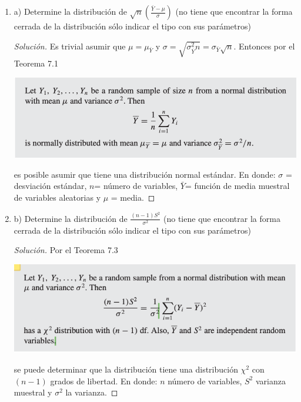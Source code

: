 \documentclass[a4paper,12pt]{article}
\newenvironment{solution}
  {\renewcommand\qedsymbol{$\blacksquare$}\begin{proof}[Solución]}
  {\end{proof}}
\begin{document}
\begin{enumerate}
\item a) Determine la distribución de $\sqrt{n}\left(\frac{\bar{Y}-\mu}{\sigma}\right)$ (no tiene que encontrar la forma cerrada de la distribución sólo indicar el tipo con sus parámetros)
\begin{solution}
Es trivial asumir que $\mu=\mu_{\bar{Y}}$ y $\sigma=\sqrt{\sigma_{\bar{Y}}^2 n}=\sigma_{\bar{Y}}\sqrt{n}$.  Entonces por el Teorema 7.1 
\begin{center}
    \includegraphics[scale=0.3]{images/teo7_1.png}
\end{center}
es posible asumir que tiene una distribución normal estándar. En donde: $\sigma$ = desviación estándar, $n$= número de variables, $\bar{Y}$= función de media muestral de variables aleatorias y $\mu$ = media. 
\end{solution}
\item b) Determine la distribución de $\frac{(n-1) S^{2}}{\sigma^{2}}$ (no tiene que encontrar la forma cerrada de la distribución sólo indicar el tipo con sus parámetros)
\begin{solution}
Por el Teorema 7.3 
\begin{center}
    \includegraphics[scale=0.5]{images/4-2.png}
\end{center}
se puede determinar que la distribución tiene una distribución $\chi^2$ con $(n-1)$ grados de libertad. En donde: $n$ número de variables, $S^2$ varianza muestral y $\sigma^2$ la varianza.


\end{solution}
\end{enumerate}
\end{document}
